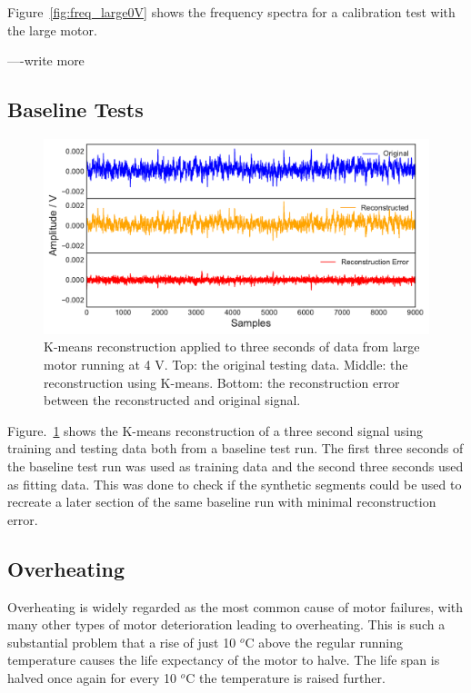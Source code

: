 Figure~\ref{fig:freq_large0V} shows the frequency spectra for a calibration test with the large motor. 

----write more

\subsection{Baseline Tests}

\begin{figure}[t]
    \includegraphics[width=1.0\textwidth]{fig/kmeans_large_4Vnowater.pdf}
    \caption[K-means Large Motor Reconstruction No Water]{K-means reconstruction applied to three seconds of data from large motor running at 4 V. Top: the original testing data. Middle: the reconstruction using K-means. Bottom: the reconstruction error between the reconstructed and original signal.}
    \label{fig:kmeans_large4V}
\end{figure}

Figure.~\ref{fig:kmeans_large4V} shows the K-means reconstruction of a three second signal using training and testing data both from a baseline test run. The first three seconds of the baseline test run was used as training data and the second three seconds used as fitting data. This was done to check if the synthetic segments could be used to recreate a later section of the same baseline run with minimal reconstruction error. 

\subsection{Overheating}

Overheating is widely regarded as the most common cause of motor failures, with many other types of motor deterioration leading to overheating. This is such a substantial problem that a rise of just 10 $^o$C above the regular running temperature causes the life expectancy of the motor to halve. The life span is halved once again for every 10 $^o$C the temperature is raised further.

